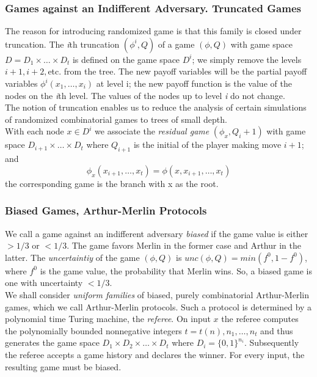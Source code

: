 \documentclass{beamer}
\begin{document}
\begin{frame}
\frametitle{Games against an Indifferent Adversary. Truncated Games}
The reason for introducing randomized game is that this family is closed under truncation. The \textit{i}th truncation $(\phi^i, Q)$ of a game $(\phi, Q)$ with game space $D = D_1 \times \ldots \times D_t$  is defined on the game space $D^i$; we simply remove the levels $i+1, i+2,$etc. from the tree. The new payoff variables will be the partial payoff variables $\phi^i(x_1,\ldots,x_i)$ at level i; the new payoff function is the value of the nodes on the \textit{i}th level. The values of the nodes up to level \textit{i} do not change.\\
The notion of truncation enables us to reduce the analysis of certain simulations of randomized combinatorial games to trees of small depth.\\
With each node $x \in D^i$ we associate the \textit{residual game} $(\phi_x, Q_i+1)$ with game space $D_{i+1}\times\ldots\times D_{t}$ where $Q_{i+1}$ is the initial of the player making move $i+1$; and $$\phi_x(x_{i+1},\ldots,x_t) = \phi(x,x_{i+1},\ldots,x_t)$$ the corresponding game is the branch with x as the root.
\end{frame}

\begin{frame}
\frametitle{Biased Games, Arthur-Merlin Protocols}
We call a game against an indifferent adversary \textit{biased} if the game value is either $>1/3$ or $< 1/3$. The game favors Merlin in the former case and Arthur in the latter. The \textit{uncertaintiy} of the game $(\phi, Q)$ is $unc(\phi, Q) = min(f^0, 1- f^0)$, where $f^0$ is the game value, the probability that Merlin wins. So, a biased game is one with uncertainty $<1/3$.\\
We shall consider \textit{uniform families} of biased, purely combinatorial Arthur-Merlin games, which we call Arthur-Merlin protocols. Such a protocol is determined by a polynomial time Turing machine, the \textit{referee}. On input $x$ the referee computes the polynomially bounded nonnegative integers $t = t(n), n_1,\ldots,n_t$ and thus generates the game space $D_1 \times D_2 \times \ldots \times D_t$ where $D_i = \{0, 1\}^{n_i}$. Subsequently the referee accepts a game history and declares the winner. For every input, the resulting game must be biased. 
\end{frame}
\end{document}
